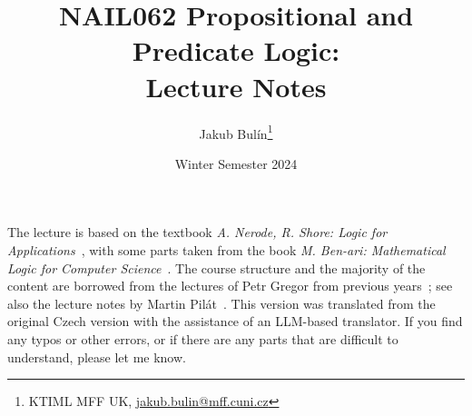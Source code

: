 \title{NAIL062 Propositional and Predicate Logic: \\ Lecture Notes}
\author{Jakub Bulín\footnote{KTIML MFF UK, \href{mailto://jakub.bulin@mff.cuni.cz}{jakub.bulin@mff.cuni.cz}}}
\date{Winter Semester 2024}
\maketitle

The lecture is based on the textbook \emph{A. Nerode, R. Shore: Logic for Applications}~\cite{nerode_logic_2012}, with some parts taken from the book \emph{M. Ben-ari: Mathematical Logic for Computer Science}~\cite{ben-ari_mathematical_2012}. The course structure and the majority of the content are borrowed from the lectures of Petr Gregor from previous years~\cite{gregor_vyrokova_nodate}; see also the lecture notes by Martin Pilát~\cite{pilat_lecture_nodate}. This version was translated from the original Czech version with the assistance of an LLM-based translator. If you find any typos or other errors, or if there are any parts that are difficult to understand, please let me know.

\tableofcontents
